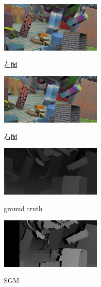 \begin{figure}[htbp]
\begin{minipage}{0.3\linewidth}
	\end{minipage}
	\begin{minipage}{0.3\linewidth}
		\centerline{\includegraphics[width=2in]{figures/cmp_ft3d/l_039}}
		\vspace{-10pt}
		\centerline{左图}
	\end{minipage}
	\hfill
	\begin{minipage}{.3\linewidth}
		\centerline{\includegraphics[width=2in]{figures/cmp_ft3d/r_039}}
		\vspace{-10pt}
		\centerline{右图}
	\end{minipage}
	\hfill
	\begin{minipage}{0.3\linewidth}
		\centerline{\includegraphics[width=2in]{figures/cmp_ft3d/gt_039}}
		\vspace{-10pt}
		\centerline{ground truth}
	\end{minipage}
	\vfill
	\begin{minipage}{0.3\linewidth}
		\centerline{\includegraphics[width=2in]{figures/cmp_ft3d/sgm_039}}
		\vspace{-10pt}
		\centerline{SGM}
	\end{minipage}
	\hfill
	\begin{minipage}{0.3\linewidth}

\end{minipage}
\end{figure}
